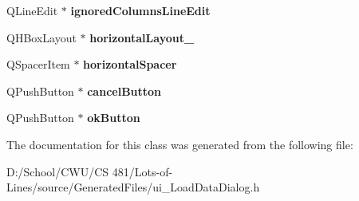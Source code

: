 \begin{DoxyCompactItemize}
\item 
Q\+Line\+Edit $\ast$ {\bfseries ignored\+Columns\+Line\+Edit}\hypertarget{class_ui___load_data_dialog_ac0064cef81f27e637f029f7f507084b8}{}\label{class_ui___load_data_dialog_ac0064cef81f27e637f029f7f507084b8}

\item 
Q\+H\+Box\+Layout $\ast$ {\bfseries horizontal\+Layout\+\_}\hypertarget{class_ui___load_data_dialog_af3b56d796d8ad28744d3e3c5985b0933}{}\label{class_ui___load_data_dialog_af3b56d796d8ad28744d3e3c5985b0933}

\item 
Q\+Spacer\+Item $\ast$ {\bfseries horizontal\+Spacer}\hypertarget{class_ui___load_data_dialog_ab7edf05ca3bd87d042689df3b0f0fe76}{}\label{class_ui___load_data_dialog_ab7edf05ca3bd87d042689df3b0f0fe76}

\item 
Q\+Push\+Button $\ast$ {\bfseries cancel\+Button}\hypertarget{class_ui___load_data_dialog_a002a831e7bd7f32444298a710f4e5bf7}{}\label{class_ui___load_data_dialog_a002a831e7bd7f32444298a710f4e5bf7}

\item 
Q\+Push\+Button $\ast$ {\bfseries ok\+Button}\hypertarget{class_ui___load_data_dialog_ad21125482fba8258459d8776b426caf4}{}\label{class_ui___load_data_dialog_ad21125482fba8258459d8776b426caf4}

\end{DoxyCompactItemize}


The documentation for this class was generated from the following file\+:\begin{DoxyCompactItemize}
\item 
D\+:/\+School/\+C\+W\+U/\+C\+S 481/\+Lots-\/of-\/\+Lines/source/\+Generated\+Files/ui\+\_\+\+Load\+Data\+Dialog.\+h\end{DoxyCompactItemize}
